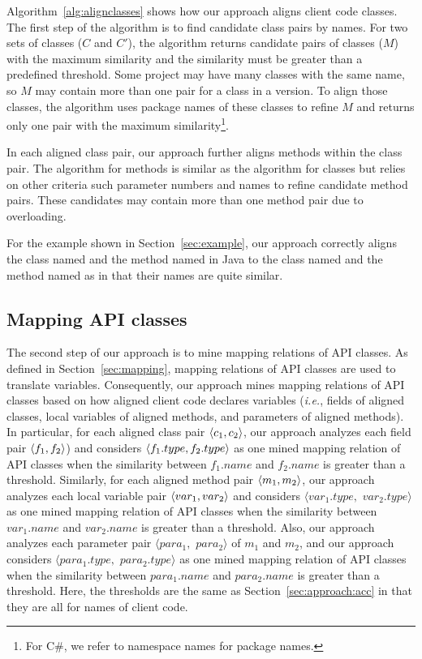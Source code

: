 Algorithm~\ref{alg:alignclasses} shows how our approach aligns
client code classes. The first step of the algorithm is to find
candidate class pairs by names. For two sets of classes ($C$ and
$C'$), the algorithm returns candidate pairs of classes ($M$) with
the maximum similarity and the similarity must be greater than a
predefined threshold. Some project may have many classes with the
same name, so $M$ may contain more than one pair for a class in a
version. To align those classes, the algorithm uses package names of
these classes to refine $M$ and returns only one pair with the
maximum similarity\footnote{For C\#, we refer to namespace names for
package names.}.

In each aligned class pair, our approach further aligns methods
within the class pair. The algorithm for methods is similar as the
algorithm for classes but relies on other criteria such parameter
numbers and names to refine candidate method pairs. These candidates
may contain more than one method pair due to overloading.

For the example shown in Section~\ref{sec:example}, our approach
correctly aligns the class named  and the method
named  in Java to the class named 
and the method named as  in that their names are quite
similar.
\subsection{Mapping API classes}
\label{sec:approach:mappingtypes} The second step of our approach is
to mine mapping relations of API classes. As defined in
Section~\ref{sec:mapping}, mapping relations of API classes are used
to translate variables. Consequently, our approach mines mapping
relations of API classes based on how aligned client code declares
variables (\emph{i.e.}, fields of aligned classes, local variables
of aligned methods, and parameters of aligned methods). In
particular, for each aligned class pair $\langle c_1, c_2 \rangle$, our
approach analyzes each field pair $\langle f_1, f_2 \rangle$) and considers
$\langle f_1.type, f_2.type \rangle$ as one mined mapping relation of API
classes when the similarity between $f_1.name$ and $f_2.name$ is
greater than a threshold. Similarly, for each aligned method pair
$\langle m_1, m_2 \rangle$, our approach analyzes each local variable pair
$\langle var_1, var_2 \rangle$ and considers $\langle var_1.type,$ $
var_2.type\rangle$ as one mined mapping relation of API classes when
the similarity between $var_1.name$ and $var_2.name$ is greater than
a threshold. Also, our approach analyzes each parameter pair
$\langle para_1, $ $para_2\rangle$ of $m_1$ and $m_2$, and our
approach considers $\langle para_1.type,$ $para_2.type\rangle$ as
one mined mapping relation of API classes when the similarity
between $para_1.name$ and $para_2.name$ is greater than a threshold.
Here, the thresholds are the same as Section~\ref{sec:approach:acc}
in that they are all for names of client code.

